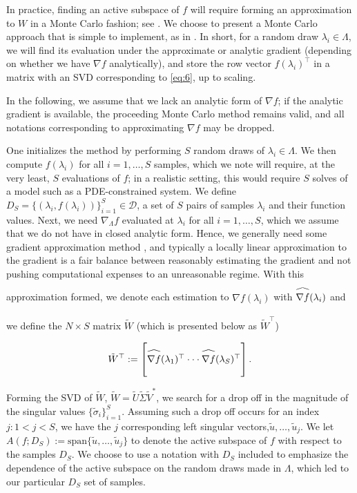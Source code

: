 \documentclass{amsart}
\newcommand\reallywidehat[1]{\arraycolsep=0pt\relax%
\begin{array}{c}
\stretchto{
  \scaleto{
    \scalerel*[\widthof{\ensuremath{#1}}]{\kern-.5pt\bigwedge\kern-.5pt}
    {\rule[-\textheight/2]{1ex}{\textheight}} %
  }{\textheight} %
}{0.5ex}\\           %
#1\\                 %
\rule{-1ex}{0ex}
\end{array}
}
\begin{document}
In practice, finding an active subspace of $f$ will require forming an approximation to $W$ in a Monte Carlo fashion; see \cite{ConstantineMC}. We choose to present a Monte Carlo approach that is simple to implement, as in \cite{Russi}. In short, for a random draw $\lambda_i \in \Lambda$, we will find its evaluation under the approximate or analytic gradient (depending on whether we have $\nabla f$ analytically), and store the row vector $f(\lambda_i)^\top$ in a matrix with an SVD corresponding to \eqref{eq:6}, up to scaling.

In the following, we assume that we lack an analytic form of $\nabla f$; if the analytic gradient is available, the proceeding Monte Carlo method remains valid, and all notations corresponding to approximating $\nabla f$ may be dropped.


One initializes the method by performing $S$ random draws of $\lambda_i \in \Lambda$. We then compute $f(\lambda_i)$ for all $i=1,\ldots,S$ samples, which we note will require, at the very least, $S$ evaluations of $f$; in a realistic setting, this would require $S$ solves of a model such as a PDE-constrained system. We define $D_S=\{(\lambda_i,f(\lambda_i))\}_{i=1}^S\in \mathcal{D}$, a set of $S$ pairs of samples $\lambda_i$ and their function values. Next, we need $\nabla_\Lambda f$ evaluated at $\lambda_i$ for all $i=1,\ldots,S$, which we assume that we do not have in closed analytic form. Hence, we generally need some gradient approximation method \cite{Smith}, and typically a locally linear approximation to the gradient is a fair balance between reasonably estimating the gradient and not pushing computational expenses to an unreasonable regime. With this approximation formed, we denote each estimation to $\nabla f(\lambda_i)$ with $\reallywidehat{\nabla f}(\lambda_i)$ and we define the $N \times S$ matrix $\tilde{W}$ (which is presented below as $\tilde{W}^\top$)

\begin{equation} \label{eq:9}
\tilde{W}^\top:=\begin{bmatrix}
\reallywidehat{\nabla f}(\lambda_1)^\top
\cdot \cdot \cdot
\reallywidehat{\nabla f}(\lambda_S)^\top\\
\end{bmatrix}.
\end{equation}  

Forming the SVD of $\tilde{W}$, $\tilde{W}=\tilde{U}\tilde{\Sigma}\tilde{V}^*$, we search for a drop off in the magnitude of the singular values $\{\tilde{\sigma}_i\}_{i=1}^S$. Assuming such a drop off occurs for an index $j:1<j<S$, we have the $j$ corresponding left singular vectors,$ \tilde{u},\ldots,\tilde{u}_{j}$.  We let $A\left(f; D_S \right):=\text{span}\{\tilde{u},\ldots,\tilde{u}_{j}\}$ to denote the active subspace of $f$ with respect to the samples $D_S$. We choose to use a notation with $D_S$ included to emphasize the dependence of the active subspace on the random draws made in $\Lambda$, which led to our particular $D_S$ set of samples.
\end{document}
